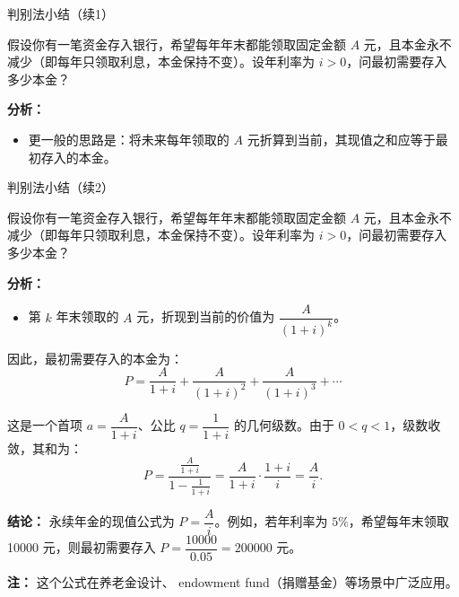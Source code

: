 \documentclass[aspectratio=169,10pt,fontset=fandol]{ctexbeamer}
\begin{document}
\begin{frame}[t,fragile]{判别法小结（续1）}
\footnotesize
{\footnotesize
\begin{application}

假设你有一笔资金存入银行，希望每年年末都能领取固定金额 \(A\) 元，且本金永不减少（即每年只领取利息，本金保持不变）。设年利率为 \(i>0\)，问最初需要存入多少本金？

\textbf{分析：}
\begin{itemize}

\item 更一般的思路是：将未来每年领取的 \(A\) 元折算到当前，其现值之和应等于最初存入的本金。

\end{itemize}\end{application}
}
\end{frame}
\begin{frame}[t,fragile]{判别法小结（续2）}
\footnotesize
{\footnotesize
\begin{application}

假设你有一笔资金存入银行，希望每年年末都能领取固定金额 \(A\) 元，且本金永不减少（即每年只领取利息，本金保持不变）。设年利率为 \(i>0\)，问最初需要存入多少本金？

\textbf{分析：}
\begin{itemize}

\item 第 \(k\) 年末领取的 \(A\) 元，折现到当前的价值为 \(\dfrac{A}{(1+i)^k}\)。
\end{itemize}

因此，最初需要存入的本金为：
\[
P = \frac{A}{1+i} + \frac{A}{(1+i)^2} + \frac{A}{(1+i)^3} + \cdots
\]

这是一个首项 \(a=\dfrac{A}{1+i}\)、公比 \(q=\dfrac{1}{1+i}\) 的几何级数。由于 \(0<q<1\)，级数收敛，其和为：
\[
P=\frac{\frac{A}{1+i}}{1-\frac{1}{1+i}}
=\frac{A}{1+i}\cdot\frac{1+i}{i}
=\frac{A}{i}.
\]

\textbf{结论：} 永续年金的现值公式为 \(P=\dfrac{A}{i}\)。例如，若年利率为 \(5\%\)，希望每年末领取 10000 元，则最初需要存入 \(P=\dfrac{10000}{0.05}=200000\) 元。

\textbf{注：} 这个公式在养老金设计、 endowment fund（捐赠基金）等场景中广泛应用。
\end{application}
}
\end{frame}
\end{document}
